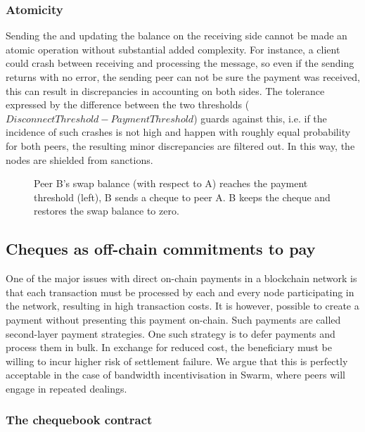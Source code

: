 \subsubsection{Atomicity}

Sending the  and updating the balance on the receiving side cannot be made an atomic operation without substantial added complexity. For instance, a client could crash between receiving and processing the message, so even if the sending returns with no error, the sending peer can not be sure the payment was received, this can result in discrepancies in accounting on both sides. The tolerance expressed by the difference between the two thresholds ($\mathit{DisconnectThreshold}-\mathit{PaymentThreshold}$) guards against this, i.e. if the incidence of such crashes is not high and happen with roughly equal probability for both peers, the resulting minor discrepancies are filtered out. In this way, the nodes are shielded from sanctions.

\begin{center}
\begin{figure}[htbp]

\caption[Cheque swap \statusgreen]{Peer B's swap balance (with respect to A) reaches the payment threshold (left),
B sends a cheque to peer A. B keeps the cheque and restores the swap balance to zero.}
\label{fig:chequeswap}
\end{figure}
\end{center}

\subsection{Cheques as off-chain commitments to pay\statusgreen}\label{sec:cheques}

One of the major issues with direct on-chain payments in a blockchain network is that each transaction must be processed by each and every node participating in the network, resulting in high transaction costs. It is however, possible to create a payment without presenting this payment on-chain. Such payments are called second-layer payment strategies. One such strategy is to defer payments and process them in bulk. In exchange for reduced cost, the beneficiary must be willing to incur higher risk of settlement failure. We argue that this is perfectly acceptable in the case of bandwidth incentivisation in Swarm, where peers will engage in repeated dealings.


\subsubsection{The chequebook contract}

